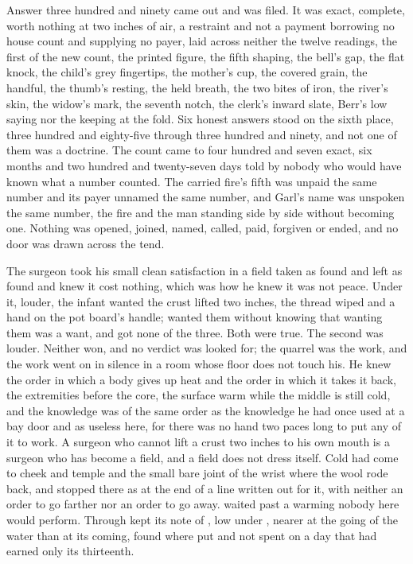 Answer three hundred and ninety came out and was filed. It was exact, complete, worth nothing at two inches of air, a restraint and not a payment borrowing no house count and supplying no payer, laid across neither the twelve readings, the first of the new count, the printed figure, the fifth shaping, the bell's gap, the flat knock, the child's grey fingertips, the mother's cup, the covered grain, the handful, the thumb's resting, the held breath, the two bites of iron, the river's skin, the widow's mark, the seventh notch, the clerk's inward slate, Berr's low saying nor the keeping at the fold. Six honest answers stood on the sixth place, three hundred and eighty-five through three hundred and ninety, and not one of them was a doctrine. The count came to four hundred and seven exact, six months and two hundred and twenty-seven days told by nobody who would have known what a number counted. The carried fire's fifth was unpaid the same number and its payer unnamed the same number, and Garl's name was unspoken the same number, the fire and the man standing side by side without becoming one. Nothing was opened, joined, named, called, paid, forgiven or ended, and no door was drawn across the tend.

The surgeon took his small clean satisfaction in a field taken as found and left as found and knew it cost nothing, which was how he knew it was not peace. Under it, louder, the infant wanted the crust lifted two inches, the thread wiped and a hand on the pot board's handle; wanted them without knowing that wanting them was a want, and got none of the three. Both were true. The second was louder. Neither won, and no verdict was looked for; the quarrel was the work, and the work went on in silence in a room whose floor does not touch his. He knew the order in which a body gives up heat and the order in which it takes it back, the extremities before the core, the surface warm while the middle is still cold, and the knowledge was of the same order as the knowledge he had once used at a bay door and as useless here, for there was no hand two paces long to put any of it to work. A surgeon who cannot lift a crust two inches to his own mouth is a surgeon who has become a field, and a field does not dress itself. Cold had come to cheek and temple and the small bare joint of the wrist where the wool rode back, and stopped there as at the end of a line written out for it, with neither an order to go farther nor an order to go away.  waited past a warming nobody here would perform. Through   kept its note of , low under , nearer at the going of the water than at its coming, found where put and not spent on a day that had earned only its thirteenth.


